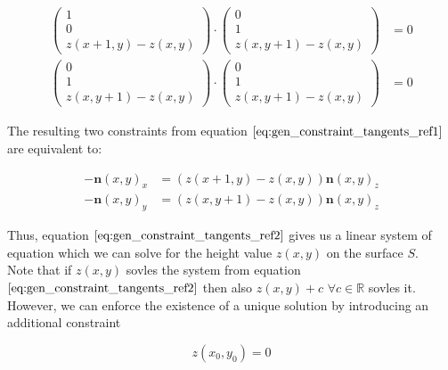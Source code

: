 \documentclass{paper}
\begin{document}
\begin{align}
    \left(
        \begin{array}{c}
            1 \\
            0 \\
            z(x+1,y)-z(x,y)
        \end{array}
    \right) 
    \cdot 
    \left(
        \begin{array}{c}
            0 \\
            1 \\
            z(x,y+1)-z(x,y)
        \end{array}
    \right) &= 0 \nonumber \\
        \left(
        \begin{array}{c}
            0 \\
            1 \\
            z(x,y+1)-z(x,y)
        \end{array}
    \right) 
    \cdot 
    \left(
        \begin{array}{c}
            0 \\
            1 \\
            z(x,y+1)-z(x,y)
        \end{array}
    \right) &= 0 
\label{eq:gen_constraint_tangents_ref1}
\end{align}

The resulting two constraints from equation $\ref{eq:gen_constraint_tangents_ref1}$ are equivalent to:

\begin{align}
    -\textbf{n}(x,y)_x &= \left(z(x+1,y)-z(x,y)\right)\textbf{n}(x,y)_z \nonumber \\
    -\textbf{n}(x,y)_y &= \left(z(x,y+1)-z(x,y)\right)\textbf{n}(x,y)_z
\label{eq:gen_constraint_tangents_ref2}
\end{align}

Thus, equation $\ref{eq:gen_constraint_tangents_ref2}$ gives us a linear system of equation which we can solve for the height value $z(x,y)$ on the surface $S$. \\

Note that if $z(x,y)$ sovles the system from equation $\ref{eq:gen_constraint_tangents_ref2}$ then also $z(x,y) + c$ $\forall c \in \mathbb{R}$ sovles it. However, we can enforce the existence of a unique solution by introducing an additional constraint

\begin{equation}
    z(x_0, y_0) = 0 
\label{eq:uniqueness_constraint}
\end{equation}
\end{document}
